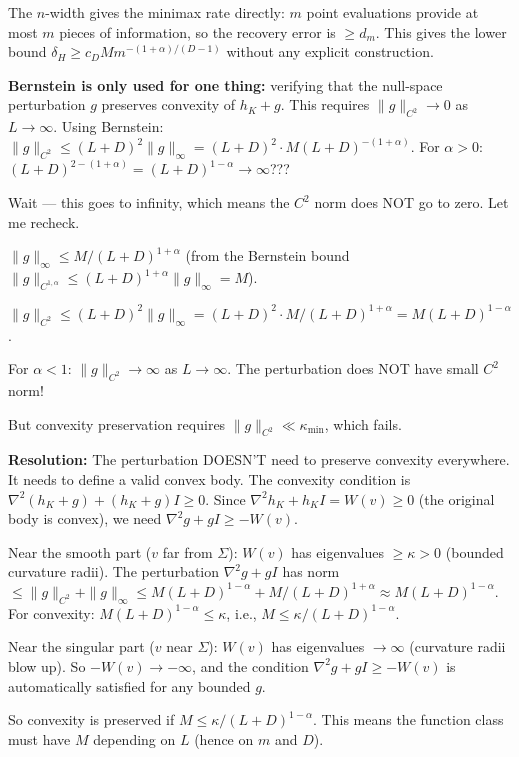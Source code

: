 The $n$-width gives the minimax rate directly: $m$ point evaluations provide at most $m$ pieces of information, so the recovery error is $\geq d_m$. This gives the lower bound $\delta_H \geq c_D M m^{-(1+\alpha)/(D-1)}$ without any explicit construction.

\textbf{Bernstein is only used for one thing:} verifying that the null-space perturbation $g$ preserves convexity of $h_K + g$. This requires $\|g\|_{C^2} \to 0$ as $L \to \infty$. Using Bernstein: $\|g\|_{C^2} \leq (L+D)^2 \|g\|_\infty = (L+D)^2 \cdot M(L+D)^{-(1+\alpha)}$. For $\alpha > 0$: $(L+D)^{2-(1+\alpha)} = (L+D)^{1-\alpha} \to \infty$???

Wait --- this goes to infinity, which means the $C^2$ norm does NOT go to zero. Let me recheck.

$\|g\|_\infty \leq M / (L+D)^{1+\alpha}$ (from the Bernstein bound $\|g\|_{C^{1,\alpha}} \leq (L+D)^{1+\alpha} \|g\|_\infty = M$).

$\|g\|_{C^2} \leq (L+D)^2 \|g\|_\infty = (L+D)^2 \cdot M/(L+D)^{1+\alpha} = M(L+D)^{1-\alpha}$.

For $\alpha < 1$: $\|g\|_{C^2} \to \infty$ as $L \to \infty$. The perturbation does NOT have small $C^2$ norm!

But convexity preservation requires $\|g\|_{C^2} \ll \kappa_{\min}$, which fails.

\textbf{Resolution:} The perturbation DOESN'T need to preserve convexity everywhere. It needs to define a valid convex body. The convexity condition is $\nabla^2(h_K + g) + (h_K + g)I \geq 0$. Since $\nabla^2 h_K + h_K I = W(v) \geq 0$ (the original body is convex), we need $\nabla^2 g + gI \geq -W(v)$.

Near the smooth part ($v$ far from $\Sigma$): $W(v)$ has eigenvalues $\geq \kappa > 0$ (bounded curvature radii). The perturbation $\nabla^2 g + gI$ has norm $\leq \|g\|_{C^2} + \|g\|_\infty \leq M(L+D)^{1-\alpha} + M/(L+D)^{1+\alpha} \approx M(L+D)^{1-\alpha}$. For convexity: $M(L+D)^{1-\alpha} \leq \kappa$, i.e., $M \leq \kappa / (L+D)^{1-\alpha}$.

Near the singular part ($v$ near $\Sigma$): $W(v)$ has eigenvalues $\to \infty$ (curvature radii blow up). So $-W(v) \to -\infty$, and the condition $\nabla^2 g + gI \geq -W(v)$ is automatically satisfied for any bounded $g$.

So convexity is preserved if $M \leq \kappa / (L+D)^{1-\alpha}$. This means the function class must have $M$ depending on $L$ (hence on $m$ and $D$).

